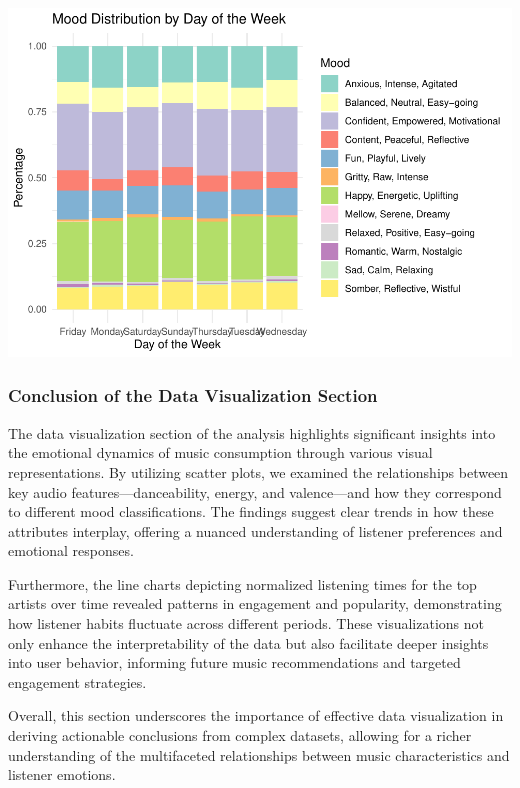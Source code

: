 \documentclass[
]{article}
\begin{document}
\includegraphics{SpotifyProjectPDF_files/figure-latex/unnamed-chunk-16-1.pdf}

\subsubsection{Conclusion of the Data Visualization
Section}\label{conclusion-of-the-data-visualization-section}

The data visualization section of the analysis highlights significant
insights into the emotional dynamics of music consumption through
various visual representations. By utilizing scatter plots, we examined
the relationships between key audio features---danceability, energy, and
valence---and how they correspond to different mood classifications. The
findings suggest clear trends in how these attributes interplay,
offering a nuanced understanding of listener preferences and emotional
responses.

Furthermore, the line charts depicting normalized listening times for
the top artists over time revealed patterns in engagement and
popularity, demonstrating how listener habits fluctuate across different
periods. These visualizations not only enhance the interpretability of
the data but also facilitate deeper insights into user behavior,
informing future music recommendations and targeted engagement
strategies.

Overall, this section underscores the importance of effective data
visualization in deriving actionable conclusions from complex datasets,
allowing for a richer understanding of the multifaceted relationships
between music characteristics and listener emotions.
\end{document}
